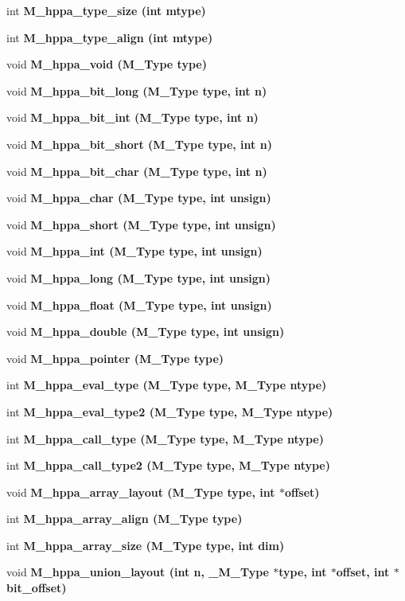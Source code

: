 \begin{CompactItemize}
\item 
int \bf{M\_\-hppa\_\-type\_\-size} (int mtype)
\item 
int \bf{M\_\-hppa\_\-type\_\-align} (int mtype)
\item 
void \bf{M\_\-hppa\_\-void} (\bf{M\_\-Type} type)
\item 
void \bf{M\_\-hppa\_\-bit\_\-long} (\bf{M\_\-Type} type, int n)
\item 
void \bf{M\_\-hppa\_\-bit\_\-int} (\bf{M\_\-Type} type, int n)
\item 
void \bf{M\_\-hppa\_\-bit\_\-short} (\bf{M\_\-Type} type, int n)
\item 
void \bf{M\_\-hppa\_\-bit\_\-char} (\bf{M\_\-Type} type, int n)
\item 
void \bf{M\_\-hppa\_\-char} (\bf{M\_\-Type} type, int unsign)
\item 
void \bf{M\_\-hppa\_\-short} (\bf{M\_\-Type} type, int unsign)
\item 
void \bf{M\_\-hppa\_\-int} (\bf{M\_\-Type} type, int unsign)
\item 
void \bf{M\_\-hppa\_\-long} (\bf{M\_\-Type} type, int unsign)
\item 
void \bf{M\_\-hppa\_\-float} (\bf{M\_\-Type} type, int unsign)
\item 
void \bf{M\_\-hppa\_\-double} (\bf{M\_\-Type} type, int unsign)
\item 
void \bf{M\_\-hppa\_\-pointer} (\bf{M\_\-Type} type)
\item 
int \bf{M\_\-hppa\_\-eval\_\-type} (\bf{M\_\-Type} type, \bf{M\_\-Type} ntype)
\item 
int \bf{M\_\-hppa\_\-eval\_\-type2} (\bf{M\_\-Type} type, \bf{M\_\-Type} ntype)
\item 
int \bf{M\_\-hppa\_\-call\_\-type} (\bf{M\_\-Type} type, \bf{M\_\-Type} ntype)
\item 
int \bf{M\_\-hppa\_\-call\_\-type2} (\bf{M\_\-Type} type, \bf{M\_\-Type} ntype)
\item 
void \bf{M\_\-hppa\_\-array\_\-layout} (\bf{M\_\-Type} type, int $\ast$offset)
\item 
int \bf{M\_\-hppa\_\-array\_\-align} (\bf{M\_\-Type} type)
\item 
int \bf{M\_\-hppa\_\-array\_\-size} (\bf{M\_\-Type} type, int dim)
\item 
void \bf{M\_\-hppa\_\-union\_\-layout} (int n, \bf{\_\-M\_\-Type} $\ast$type, int $\ast$offset, int $\ast$bit\_\-offset)
\item 

\end{CompactItemize}
